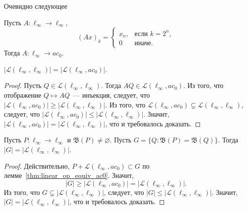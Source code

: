 Очевидно следующее
\begin{proposition}
	Пусть $A:\ell_\infty\to\ell_\infty$,
	\begin{equation}
		(Ax)_k=\begin{cases}
			x_n, & \mbox{если~} k=2^n,
			\\
			0    & \mbox{иначе.}
		\end{cases}
	\end{equation}
	Тогда $A:\ell_\infty\to ac_0$.
\end{proposition}

\begin{corollary}
	$|\mathcal{L}(\ell_\infty,\ell_\infty)|=|\mathcal{L}(\ell_\infty,ac_0)|$.
\end{corollary}

\begin{proof}
	Пусть $Q\in \mathcal{L}(\ell_\infty,\ell_\infty)$.
	Тогда $AQ\in \mathcal{L}(\ell_\infty,ac_0)$.
	Из того, что отображение $Q\mapsto AQ$~--- инъекция,
	следует, что $|\mathcal{L}(\ell_\infty,ac_0)|\geq      |\mathcal{L}(\ell_\infty,\ell_\infty)|$.
	Из того, что $ \mathcal{L}(\ell_\infty,ac_0) \subsetneq \mathcal{L}(\ell_\infty,\ell_\infty) $,
	следует, что $|\mathcal{L}(\ell_\infty,ac_0)|\leq      |\mathcal{L}(\ell_\infty,\ell_\infty)|$.
	Значит,      $|\mathcal{L}(\ell_\infty,ac_0)|=         |\mathcal{L}(\ell_\infty,\ell_\infty)|$,
	что и требовалось доказать.
\end{proof}

\begin{corollary}
	Пусть $P:\ell_\infty \to \ell_\infty$ и $\mathfrak{B}(P)\neq\varnothing$.
	Пусть $G = \{Q: \mathfrak{B}(P)= \mathfrak{B}(Q)\}$.
	Тогда $|G| = |\mathcal{L}(\ell_\infty,\ell_\infty)|$.
\end{corollary}

\begin{proof}
	Действительно,
	$P+\mathcal{L}(\ell_\infty,ac_0) \subset G$ по лемме~\ref{thm:linear_op_equiv_ac0}.
	Значит,
	\begin{equation}
		|G| \geq |\mathcal{L}(\ell_\infty,ac_0)|=|\mathcal{L}(\ell_\infty,\ell_\infty)|
		.
	\end{equation}
	Из того, что $G\subsetneq|\mathcal{L}(\ell_\infty,\ell_\infty)|$,
	следует, что $|G|\leq|\mathcal{L}(\ell_\infty,\ell_\infty)|$.
	Значит, $|G|=|\mathcal{L}(\ell_\infty,\ell_\infty)|$,
	что и требовалось доказать.
\end{proof}



